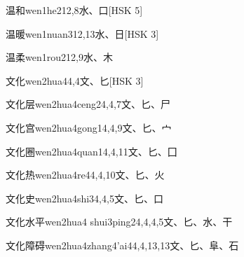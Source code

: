\begin{entry}{温和}{wen1he2}{12,8}{⽔、⼝}[HSK 5]
\end{entry}

\begin{entry}{温暖}{wen1nuan3}{12,13}{⽔、⽇}[HSK 3]
\end{entry}

\begin{entry}{温柔}{wen1rou2}{12,9}{⽔、⽊}
\end{entry}

\begin{entry}{文化}{wen2hua4}{4,4}{⽂、⼔}[HSK 3]
\end{entry}

\begin{entry}{文化层}{wen2hua4ceng2}{4,4,7}{⽂、⼔、⼫}
\end{entry}

\begin{entry}{文化宫}{wen2hua4gong1}{4,4,9}{⽂、⼔、⼧}
\end{entry}

\begin{entry}{文化圈}{wen2hua4quan1}{4,4,11}{⽂、⼔、⼞}
\end{entry}

\begin{entry}{文化热}{wen2hua4re4}{4,4,10}{⽂、⼔、⽕}
\end{entry}

\begin{entry}{文化史}{wen2hua4shi3}{4,4,5}{⽂、⼔、⼝}
\end{entry}

\begin{entry}{文化水平}{wen2hua4 shui3ping2}{4,4,4,5}{⽂、⼔、⽔、⼲}
\end{entry}

\begin{entry}{文化障碍}{wen2hua4zhang4'ai4}{4,4,13,13}{⽂、⼔、⾩、⽯}
\end{entry}

